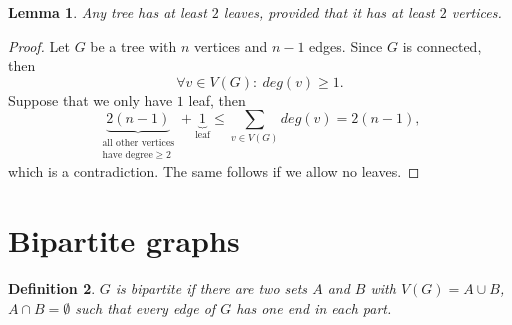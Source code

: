 \documentclass[a4paper]{article}
\theoremstyle{plain}
\newtheorem{lemma}{Lemma}
\newtheorem{definition}[lemma]{Definition}
\theoremstyle{myremark}
\begin{document}
\begin{lemma} \label{Lemma 7}
Any tree has at least $2$ leaves, provided that it has at least $2$ vertices.
\end{lemma}

\begin{proof}
Let $G$ be a tree with $n$ vertices and $n-1$ edges. Since $G$ is connected, then 
$$\forall v\in V(G): \ deg(v)\geqslant 1.$$
Suppose that we only have $1$ leaf, then
$$\underbrace{2(n-1)}_{\substack{\text{all other vertices}\\ \text{have degree} \geqslant 2}} +\underbrace{1}_{\text{leaf}} \leqslant \sum_{v\in V(G)}deg(v)=2(n-1),$$
which is a contradiction. The same follows if we allow no leaves.
\end{proof}

\section*{Bipartite graphs}
\begin{definition} $G$ is \emph{bipartite} if there are two sets $A$ and $B$ with $V(G)=A\cup B$, $A\cap B=\emptyset$ such that every edge of $G$ has one end in each part.
\end{definition}
\end{document}
